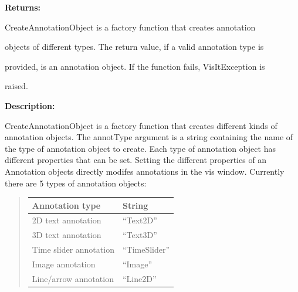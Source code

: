 \documentclass[letterpaper,10pt,english]{sphinxmanual}
\begin{document}
\begin{DUlineblock}{0em}
\item[] 
\item[] \textbf{Returns:}
\item[] CreateAnnotationObject is a factory function that creates annotation
\item[] objects of different types. The return value, if a valid annotation type is
\item[] provided, is an annotation object. If the function fails, VisItException is
\item[] raised.
\item[] 
\item[] \textbf{Description:}
\item[] CreateAnnotationObject is a factory function that creates different kinds
of annotation objects. The annotType argument is a string containing the
name of the type of annotation object to create. Each type of annotation
object has different properties that can be set. Setting the different
properties of an Annotation objects directly modifes annotations in the vis
window. Currently there are 5 types of annotation objects:
\item[] 
\end{DUlineblock}
\begin{quote}

\begin{tabulary}{\linewidth}{|L|L|}
\hline

\textbf{Annotation type}
 & 
String
\\
\hline
2D text annotation
 & 
``Text2D''
\\
\hline
3D text annotation
 & 
``Text3D''
\\
\hline
Time slider annotation
 & 
``TimeSlider''
\\
\hline
Image annotation
 & 
``Image''
\\
\hline
Line/arrow annotation
 & 
``Line2D''
\\
\hline\end{tabulary}

\end{quote}

\begin{DUlineblock}{0em}
\item[] 
\end{DUlineblock}
\end{document}
